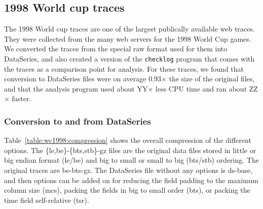 \documentclass{acm_proc_article-sp}
\begin{document}
\subsection{1998 World cup traces}\label{sec:world-cup-1998}

The 1998 World cup traces\cite{ita08} are one of the largest
publically available web traces.  They were collected from the many
web servers for the 1998 World Cup games.  We converted the traces
from the special raw format used for them into DataSeries, and also
created a version of the {\tt checklog} program that comes with the
traces as a comparison point for analysis.  For these traces, we found
that conversion to DataSeries files were on average 0.93$\times$ the
size of the original files, and that the analysis program used about
YY$\times$ less CPU time and ran about ZZ$\times$ faster.

\subsubsection{Conversion to and from DataSeries}

Table~\ref{table:wc1998:compression} shows the overall compression of
the different options.  The \{le,be\}-\{bts,stb\}-gz files are the
original data files stored in little or big endian format (le/be) and
big to small or small to big (bts/stb) ordering.  The original traces
are be-bts-gz.  The DataSeries file without any options is ds-base,
and then options can be added on for reducing the field padding to the
maximum column size (mcs), packing the fields in big to small order
(bts), or packing the time field self-relative (tsr).

\end{document}
